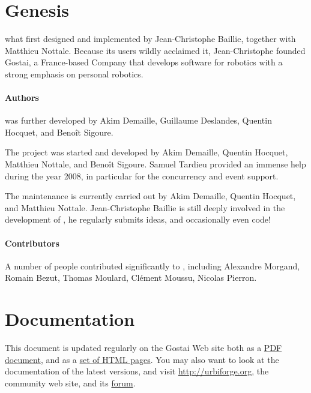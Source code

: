 \section{Genesis}
\label{sec:genesis}
\urbi what first designed and implemented by Jean-Christophe Baillie,
together with Matthieu Nottale.  Because its users wildly acclaimed it,
Jean-Christophe founded Gostai, a France-based Company that develops
software for robotics with a strong emphasis on personal robotics.

\paragraph{Authors}
 was further developed by Akim Demaille, Guillaume Deslandes, Quentin
Hocquet, and Benoît Sigoure.

The  project was started and developed by Akim Demaille, Quentin
Hocquet, Matthieu Nottale, and Benoît Sigoure.  Samuel Tardieu provided an
immense help during the year 2008, in particular for the concurrency and
event support.

The maintenance is currently carried out by Akim Demaille, Quentin Hocquet,
and Matthieu Nottale.  Jean-Christophe Baillie is still deeply involved in
the development of \us, he regularly submits ideas, and occasionally even
code!

\paragraph{Contributors}

A number of people contributed significantly to \urbi, including Alexandre
Morgand, Romain Bezut, Thomas Moulard, Clément Moussu, Nicolas Pierron.

\section{Documentation}

This document is updated regularly on the Gostai Web site both as a
\href{\docurl/urbi-sdk.pdf}{PDF document}, and as a
\href{\docurl/urbi-sdk.htmldir/}{set of HTML pages}.  You may also want to
look at the documentation of the latest versions, and visit
\url{http://urbiforge.org}, the \urbi community web site, and its
\href{http://forum.urbiforge.org}{forum}.

